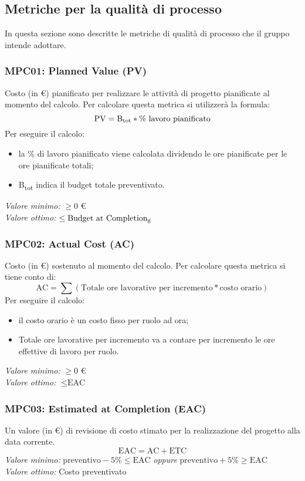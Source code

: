 \subsection{Metriche per la qualità di processo}
In questa sezione sono descritte le metriche di qualità di processo che il gruppo intende adottare.

\subsubsection{MPC01: Planned Value (PV)}
Costo (in \euro) pianificato per realizzare le attività di progetto pianificate al momento del calcolo.
Per calcolare questa metrica si utilizzerà la formula:
\begin{equation*}
\text{PV}=\text{B}\textsubscript{tot} * \%\text{ lavoro pianificato}
\end{equation*}
\noindent Per eseguire il calcolo:
\begin{itemize}
\item la \% di lavoro pianificato viene calcolata dividendo le ore pianificate per le ore pianificate totali;
\item B\textsubscript{tot} indica il budget totale preventivato.
\end{itemize}
\textit{Valore minimo:} $\ge 0$ \euro\\
\textit{Valore ottimo:}	$\le \text{Budget at Completion\textsubscript{g}}$
\subsubsection{MPC02: Actual Cost (AC)}
Costo (in \euro) sostenuto al momento del calcolo.
Per calcolare questa metrica si tiene conto di:
\begin{equation*}
\text{AC}=\sum (\text{Totale ore lavorative per incremento}*\text{costo orario})
\end{equation*}
\noindent Per eseguire il calcolo:
\begin{itemize}
\item il costo orario è un costo fisso per ruolo ad ora;
\item Totale ore lavorative per incremento va a contare per incremento le ore effettive di lavoro per ruolo.
\end{itemize}
\textit{Valore minimo:} $\ge 0$ \euro\\
\textit{Valore ottimo:} $\le \text{EAC}$
\subsubsection{MPC03: Estimated at Completion (EAC)}
Un valore (in \euro) di revisione di costo stimato per la realizzazione del progetto alla data corrente.
\begin{equation*}
\text{EAC}=\text{AC}+\text{ETC}
\end{equation*}
\textit{Valore minimo:} 
$\text{preventivo} -5\% \le \text{EAC}$ \textit{oppure} $\text{preventivo} +5\% \ge \text{EAC}$\\
\textit{Valore ottimo:} Costo preventivato

